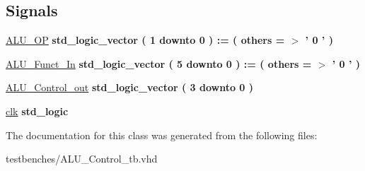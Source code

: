 \subsection*{\-Signals}
 \begin{DoxyCompactItemize}
\item 
\hypertarget{class_a_l_u___control__tb_1_1behavior_a815bf9e542a3c49c6651f755d08a4ac9}{\hyperlink{class_a_l_u___control__tb_1_1behavior_a815bf9e542a3c49c6651f755d08a4ac9}{\-A\-L\-U\-\_\-\-O\-P} {\bfseries std\-\_\-logic\-\_\-vector (   1    downto    0  )  \-:= (  others  = $>$ '  0  '  ) } }\label{class_a_l_u___control__tb_1_1behavior_a815bf9e542a3c49c6651f755d08a4ac9}

\item 
\hypertarget{class_a_l_u___control__tb_1_1behavior_afe12d1d11e7ef94c862d25007711d671}{\hyperlink{class_a_l_u___control__tb_1_1behavior_afe12d1d11e7ef94c862d25007711d671}{\-A\-L\-U\-\_\-\-Funct\-\_\-\-In} {\bfseries std\-\_\-logic\-\_\-vector (   5    downto    0  )  \-:= (  others  = $>$ '  0  '  ) } }\label{class_a_l_u___control__tb_1_1behavior_afe12d1d11e7ef94c862d25007711d671}

\item 
\hypertarget{class_a_l_u___control__tb_1_1behavior_a1b3e29926e973200886940842ebe8876}{\hyperlink{class_a_l_u___control__tb_1_1behavior_a1b3e29926e973200886940842ebe8876}{\-A\-L\-U\-\_\-\-Control\-\_\-out} {\bfseries std\-\_\-logic\-\_\-vector (   3    downto    0  ) } }\label{class_a_l_u___control__tb_1_1behavior_a1b3e29926e973200886940842ebe8876}

\item 
\hypertarget{class_a_l_u___control__tb_1_1behavior_a94eb3ba5e2f4df12778cb4b26b5f9f2e}{\hyperlink{class_a_l_u___control__tb_1_1behavior_a94eb3ba5e2f4df12778cb4b26b5f9f2e}{clk} {\bfseries std\-\_\-logic } }\label{class_a_l_u___control__tb_1_1behavior_a94eb3ba5e2f4df12778cb4b26b5f9f2e}

\end{DoxyCompactItemize}


\-The documentation for this class was generated from the following files\-:\begin{DoxyCompactItemize}
\item 
testbenches/\-A\-L\-U\-\_\-\-Control\-\_\-tb.\-vhd\end{DoxyCompactItemize}
